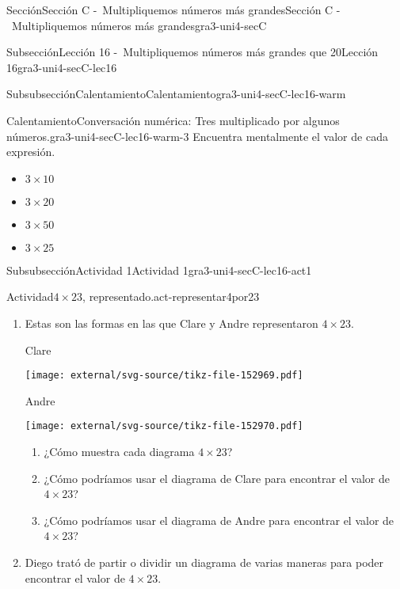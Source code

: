 \documentclass[twoside,10pt,]{article}
\begin{document}
\begin{sectionptx}{Sección}{Sección C -~Multipliquemos números más grandes}{}{Sección C -~Multipliquemos números más grandes}{}{}{gra3-uni4-secC}
\begin{subsectionptx}{Subsección}{Lección 16 -~Multipliquemos números más grandes que 20}{}{Lección 16}{}{}{gra3-uni4-secC-lec16}
\begin{subsubsectionptx}{Subsubsección}{Calentamiento}{}{Calentamiento}{}{}{gra3-uni4-secC-lec16-warm}
\begin{exploration}{Calentamiento}{Conversación numérica: Tres multiplicado por algunos números.}{gra3-uni4-secC-lec16-warm-3}%
Encuentra mentalmente el valor de cada expresión.%
%
\begin{itemize}[label=\textbullet]
\item{}\(\displaystyle 3\times 10\)%
\item{}\(\displaystyle 3\times 20\)%
\item{}\(\displaystyle 3\times 50\)%
\item{}\(\displaystyle 3\times 25\)%
\end{itemize}
\end{exploration}%
\end{subsubsectionptx}
%
%
\typeout{************************************************}
\typeout{************************************************}
%
\begin{subsubsectionptx}{Subsubsección}{Actividad 1}{}{Actividad 1}{}{}{gra3-uni4-secC-lec16-act1}
\begin{activity}{Actividad}{\(4\times 23\), representado.}{act-representar4por23}%
%
\begin{enumerate}
\item{}Estas son las formas en las que Clare y Andre representaron \(4\times 23\).%
\begin{sidebyside}{2}{0}{0}{0}%
\begin{sbspanel}{0.5}%
Clare%
\par
\texttt{[image: external/svg-source/tikz-file-152969.pdf]}
\end{sbspanel}%
\begin{sbspanel}{0.5}%
Andre%
\par
\texttt{[image: external/svg-source/tikz-file-152970.pdf]}
\end{sbspanel}%
\end{sidebyside}%
%
\begin{enumerate}
\item{}¿Cómo muestra cada diagrama \(4\times 23\)?%
\item{}¿Cómo podríamos usar el diagrama de Clare para encontrar el valor de \(4\times 23\)?%
\item{}¿Cómo podríamos usar el diagrama de Andre para encontrar el valor de \(4\times 23\)?%
\end{enumerate}
\item{}Diego trató de partir o dividir un diagrama de varias maneras para poder encontrar el valor de \(4\times 23\).%

\end{enumerate}
\end{activity}
\end{subsubsectionptx}
\end{subsectionptx}
\end{sectionptx}
\end{document}
